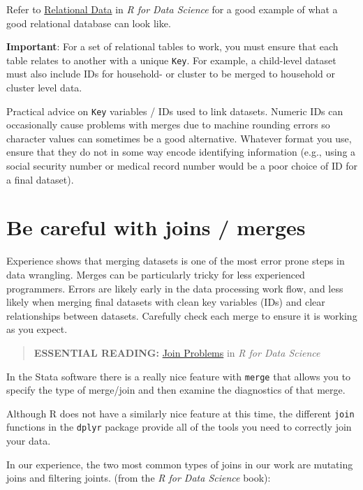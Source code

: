 \documentclass[
]{book}
\begin{document}
Refer to \href{https://r4ds.had.co.nz/relational-data.html}{Relational Data} in \emph{R for Data Science} for a good example of what a good relational database can look like.

\textbf{Important}: For a set of relational tables to work, you must ensure that each table relates to another with a unique \texttt{Key}. For example, a child-level dataset must also include IDs for household- or cluster to be merged to household or cluster level data.

Practical advice on \texttt{Key} variables / IDs used to link datasets. Numeric IDs can occasionally cause problems with merges due to machine rounding errors so character values can sometimes be a good alternative. Whatever format you use, ensure that they do not in some way encode identifying information (e.g., using a social security number or medical record number would be a poor choice of ID for a final dataset).

\section{Be careful with joins / merges}\label{be-careful-with-joins-merges}

Experience shows that merging datasets is one of the most error prone steps in data wrangling. Merges can be particularly tricky for less experienced programmers. Errors are likely early in the data processing work flow, and less likely when merging final datasets with clean key variables (IDs) and clear relationships between datasets. Carefully check each merge to ensure it is working as you expect.

\begin{quote}
\textbf{ESSENTIAL READING:} \href{https://r4ds.had.co.nz/relational-data.html#join-problems}{Join Problems} in \emph{R for Data Science}
\end{quote}

In the Stata software there is a really nice feature with \texttt{merge} that allows you to specify the type of merge/join and then examine the diagnostics of that merge.

Although R does not have a similarly nice feature at this time, the different \texttt{join} functions in the \texttt{dplyr} package provide all of the tools you need to correctly join your data.

In our experience, the two most common types of joins in our work are mutating joins and filtering joints. (from the \emph{R for Data Science} book):
\end{document}
